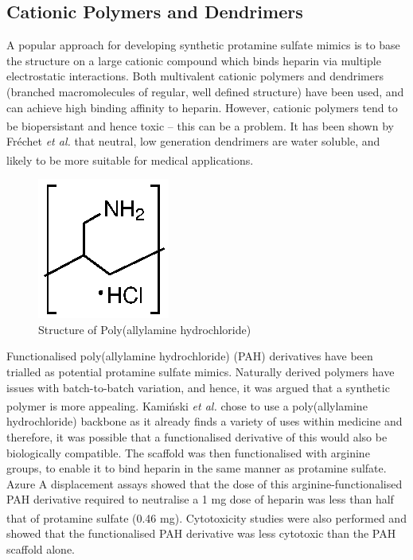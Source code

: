 \subsection{Cationic Polymers and Dendrimers}
A popular approach for developing synthetic protamine sulfate mimics is to base the structure on a large cationic compound which binds heparin via multiple electrostatic interactions. Both multivalent cationic polymers and dendrimers (branched macromolecules of regular, well defined structure) have been used, and can achieve high binding affinity to heparin. However, cationic polymers tend to be biopersistant and hence toxic – this can be a problem.\textsuperscript{\cite{Rodrigo2011Self-AssemblingBinding, Barnard2012Self-AssembledBinding}}
It has been shown by Fr\'{e}chet \textit{et al.} that neutral, low generation dendrimers are water soluble, and likely to be more suitable for medical applications.\textsuperscript{\cite{PadillaDeJesus2002PolyesterEvaluation}}

\begin{figure} [ht!]
\centering
\includegraphics[scale=1.0]{Figures/PAH_structure.eps}
\caption{Structure of Poly(allylamine hydrochloride)}
\label{PAH_structure}
\end{figure}

Functionalised poly(allylamine hydrochloride) (PAH) derivatives have  been trialled as potential protamine sulfate mimics. Naturally derived polymers have issues with batch-to-batch variation, and hence, it was argued that a synthetic polymer is more appealing.\textsuperscript{\cite{Kaminski2014NewReversal}} Kami\'{n}ski \textit{et al.} chose to use a poly(allylamine hydrochloride) backbone as it already finds a variety of uses within medicine and therefore, it was possible that a functionalised derivative of this would also be biologically compatible. The scaffold was then functionalised with arginine groups, to enable it to bind heparin in the same manner as protamine sulfate.  Azure A displacement assays showed that the dose of this arginine-functionalised PAH derivative required to neutralise a 1 mg dose of heparin was less than half that of protamine sulfate (0.46 mg).\textsuperscript{\cite{Kaminski2014NewReversal}} Cytotoxicity studies were also performed and showed that the functionalised PAH derivative was less cytotoxic than the PAH scaffold alone. 

